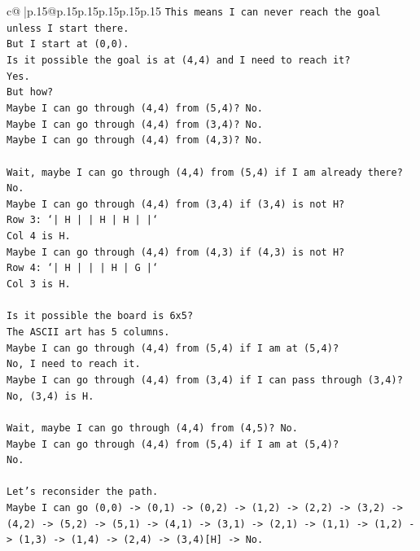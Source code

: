 \documentclass{article}
\begin{document}
{\begin{supertabular}{c@{$\;$}|p{.15\linewidth}@{}p{.15\linewidth}p{.15\linewidth}p{.15\linewidth}p{.15\linewidth}p{.15\linewidth}}
{{{\texttt{This means I can never reach the goal unless I start there.} \\
\texttt{But I start at (0,0).} \\
\texttt{Is it possible the goal is at (4,4) and I need to reach it?} \\
\texttt{Yes.} \\
\texttt{But how?} \\
\texttt{Maybe I can go through (4,4) from (5,4)? No.} \\
\texttt{Maybe I can go through (4,4) from (3,4)? No.} \\
\texttt{Maybe I can go through (4,4) from (4,3)? No.} \\
\\ 
\texttt{Wait, maybe I can go through (4,4) from (5,4) if I am already there? No.} \\
\texttt{Maybe I can go through (4,4) from (3,4) if (3,4) is not H?} \\
\texttt{Row 3: `|  H  |     |  H  |  H  |     |`} \\
\texttt{Col 4 is H.} \\
\texttt{Maybe I can go through (4,4) from (4,3) if (4,3) is not H?} \\
\texttt{Row 4: `|  H  |     |     |  H  |  G  |`} \\
\texttt{Col 3 is H.} \\
\\ 
\texttt{Is it possible the board is 6x5?} \\
\texttt{The ASCII art has 5 columns.} \\
\texttt{Maybe I can go through (4,4) from (5,4) if I am at (5,4)?} \\
\texttt{No, I need to reach it.} \\
\texttt{Maybe I can go through (4,4) from (3,4) if I can pass through (3,4)?} \\
\texttt{No, (3,4) is H.} \\
\\ 
\texttt{Wait, maybe I can go through (4,4) from (4,5)? No.} \\
\texttt{Maybe I can go through (4,4) from (5,4) if I am at (5,4)?} \\
\texttt{No.} \\
\\ 
\texttt{Let's reconsider the path.} \\
\texttt{Maybe I can go (0,0) {-}> (0,1) {-}> (0,2) {-}> (1,2) {-}> (2,2) {-}> (3,2) {-}> (4,2) {-}> (5,2) {-}> (5,1) {-}> (4,1) {-}> (3,1) {-}> (2,1) {-}> (1,1) {-}> (1,2) {-}> (1,3) {-}> (1,4) {-}> (2,4) {-}> (3,4){[}H{]} {-}> No.} \\
}}}
\end{supertabular}}
\end{document}
